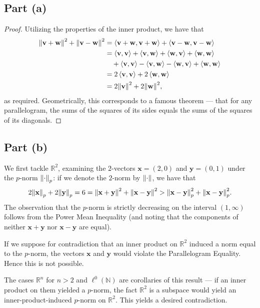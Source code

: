 \documentclass[11pt]{article}
\renewcommand{\vec}[1]{\mathbf{#1}}
\begin{document}

\subsection{Part (a)}

\begin{proof}
  Utilizing the properties of the inner product, we have that
	\begin{align*}
		\norm{\vec{v} + \vec{w}}^{2} + \norm{\vec{v} - \vec{w}}^{2} &= \ev{\vec{v} + \vec{w}, \vec{v} + \vec{w}} + \ev{\vec{v} - \vec{w}, \vec{v} - \vec{w}} \\ 
		&= \ev{\vec{v}, \vec{v}} + \ev{\vec{v}, \vec{w}} + \ev{\vec{w}, \vec{v}} + \ev{\vec{w}, \vec{w}} \\
		& \quad + \ev{\vec{v}, \vec{v}} - \ev{\vec{v}, \vec{w}} - \ev{\vec{w}, \vec{v}} + \ev{\vec{w}, \vec{w}} \\
		&= 2 \ev{\vec{v}, \vec{v}} + 2 \ev{\vec{w}, \vec{w}} \\
		&= 2 \norm{\vec{v}}^{2} + 2 \norm{\vec{w}}^{2},
	\end{align*}
	as required. Geometrically, this corresponds to a famous theorem --- that for any parallelogram, the sums of the squares of its sides equals the sums of the squares of its diagonals.
\end{proof}


\subsection{Part (b)}

We first tackle $\mathbb{R}^{2}$, examining the $2$-vectors $\vec{x} = (2, 0)$ and $\vec{y} = (0, 1)$ under the $p$-norm $\norm{\cdot }_{p}$: if we denote the $2$-norm by $\norm{\cdot}$, we have that
\begin{equation}
  2 \norm{\vec{x}}_{p} + 2 \norm{\vec{y}}_{p} = 6 = \norm{\vec{x} + \vec{y}}^{2} + \norm{\vec{x} - \vec{y}}^{2} > \norm{\vec{x} - \vec{y}}_{p}^{2} + \norm{\vec{x} - \vec{y}}_{p}^{2}.
\end{equation}
The observation that the $p$-norm is strictly decreasing on the interval $(1, \infty)$ follows from the Power Mean Inequality (and noting that the components of neither $\vec{x} + \vec{y}$ nor $\vec{x} - \vec{y}$ are equal).

If we suppose for contradiction that an inner product on $\mathbb{R}^{2}$ induced a norm equal to the $p$-norm, the vectors $\vec{x}$ and $\vec{y}$ would violate the Parallelogram Equality. Hence this is not possible.

The cases $\mathbb{R}^{n}$ for $n > 2$ and $\ell^{0}(\mathbb{N})$ are corollaries of this result --- if an inner product on them yielded a $p$-norm, the fact $\mathbb{R}^{2}$ is a subspace would yield an inner-product-induced $p$-norm on $\mathbb{R}^{2}$. This yields a desired contradiction.

\end{document}
